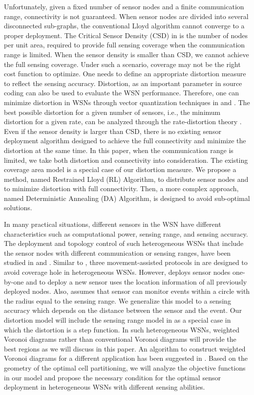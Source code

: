 \documentclass[journal,draftcls,onecolumn,12pt,twoside, narroweqnarray]{IEEEtran}
\begin{document}
Unfortunately, given a fixed number of sensor nodes and a finite communication range, connectivity is not guaranteed. When sensor nodes are divided into several disconnected sub-graphs, the conventional Lloyd algorithm cannot converge to a proper deployment. The Critical Sensor Density (CSD) in \cite{CSurvey} is the number of nodes per unit area, required to provide full sensing coverage when the communication range is limited.
When the sensor density is smaller than CSD, we cannot achieve the full sensing coverage. Under such a scenario, coverage may not be the right cost function to optimize. One needs to define an appropriate distortion measure to reflect the sensing accuracy. Distortion, as an important parameter in source coding can also be used to evaluate the WSN performance. Therefore, one can minimize distortion in WSNs through vector quantization techniques in \cite{gray1} and \cite{gershograybook}. The best possible distortion for a given number of sensors, i.e., the minimum distortion for a given rate, can be analyzed through the rate-distortion theory \cite{information theory}. Even if the sensor density is larger than CSD, there is no existing sensor deployment algorithm designed to achieve the full connectivity and minimize the distortion at the same time. In this paper, when the communication range is limited, we take both distortion and connectivity into consideration. The existing coverage area model is a special case of our distortion measure. We propose a method, named Restrained Lloyd (RL) Algorithm, to distribute sensor nodes and to minimize distortion with full connectivity. Then, a more complex approach, named Deterministic Annealing (DA) Algorithm, is designed to avoid sub-optimal solutions.

In many practical situations, different sensors in the WSN have different characteristics such as computational power, sensing range, and sensing accuracy.
The deployment and topology control of such heterogeneous WSNs that include the sensor nodes with different communication or sensing ranges, have been studied in \cite{mahboubi1} and \cite{HWS}. Similar to \cite{wang1}, three movement-assisted protocols in \cite{mahboubi1} are designed to avoid coverage hole in heterogeneous WSNs.
However, \cite{HWS} deploys sensor nodes one-by-one and to deploy a new sensor uses the location information of all previously deployed nodes. Also, \cite{HWS} assumes that sensor can monitor events within a circle with the radius equal to the sensing range. We generalize this model to a sensing accuracy which depends on the distance between the sensor and the event. Our distortion model will include the sensing range model in \cite{HWS} as a special case in which the distortion is a step function.
In such heterogeneous WSNs, weighted Voronoi diagrams \cite{VD} rather than conventional Voronoi diagrams \cite{voronoisurvey} will provide the best regions as we will discuss in this paper. An algorithm to construct weighted Voronoi diagrams for a different application has been suggested in \cite{aurenhammerwvd}. Based on the geometry of the optimal cell partitioning, we will analyze the objective functions in our model and propose the necessary condition for the optimal sensor deployment in heterogeneous WSNs with different sensing abilities.
\end{document}
